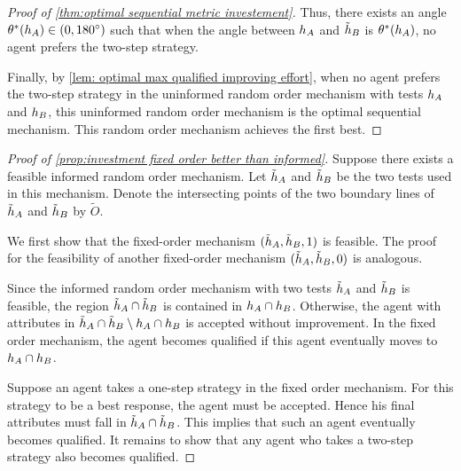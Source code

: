 \begin{proof}[Proof of \cref{thm:optimal sequential metric investement}]
    Thus, there exists an angle $\theta^*(h_A) \in (0, 180^{\circ})$ such that when the angle between $h_A$ and $\tilde {h}_B$ is $\theta^*(h_A)$, no agent prefers the two-step strategy.  

    Finally, by \cref{lem: optimal max qualified improving effort}, when no agent prefers the two-step strategy in the uninformed random order mechanism with tests $h_A$ and $h_B$, this uninformed random order mechanism is the optimal sequential mechanism. This random order mechanism achieves the first best.
\end{proof}








\begin{proof}[Proof of \cref{prop:investment fixed order better than informed}]
    Suppose there exists a feasible informed random order mechanism. Let $\tilde {h}_A$ and $\tilde {h}_B$ be the two tests used in this mechanism. 
    Denote the intersecting points of the two boundary lines of  $\tilde {h}_A$ and $\tilde {h}_B$ by $\tilde O$.
    
    We first show that the fixed-order mechanism $(\tilde {h}_A,\tilde {h}_B,1)$ is feasible. The proof for the feasibility of another fixed-order mechanism $(\tilde {h}_A,\tilde {h}_B,0)$ is analogous.

    Since the informed random order mechanism with two tests $\tilde {h}_A$ and $\tilde {h}_B$ is feasible, the region $\tilde {h}_A \cap \tilde {h}_B$ is contained in $h_A \cap h_B$. 
    Otherwise, the agent with attributes in $\tilde {h}_A \cap \tilde {h}_B \setminus h_A \cap h_B$ is accepted without improvement. In the fixed order mechanism, the agent becomes qualified if this agent eventually moves to $ h_A \cap  h_B$. 
    
    Suppose an agent takes a one-step strategy in the fixed order mechanism.
    For this strategy to be a best response, the agent must be accepted.
    Hence his final attributes must fall in $\tilde {h}_A \cap \tilde {h}_B$.
    This implies that such an agent eventually becomes qualified.
    It remains to show that any agent who takes a two-step strategy also becomes qualified.


\end{proof}
